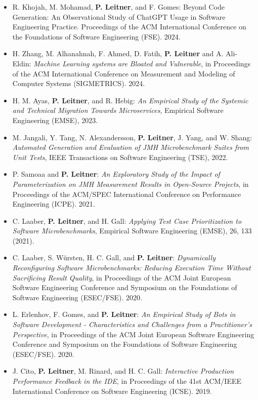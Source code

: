 \documentclass[paper=letter,fontsize=11pt]{scrartcl} %
\begin{document}
\begin{itemize}
  \itemsep0em
  \item  R. Khojah, M. Mohamad, \textbf{P. Leitner}, and F. Gomes: Beyond Code Generation: An Observational Study of ChatGPT Usage in Software Engineering Practice. Proceedings of the ACM International Conference on the Foundations of Software Engineering (FSE). 2024.
  \item H. Zhang, M. Alhanahnah, F. Ahmed, D. Fatih, \textbf{P. Leitner} and A. Ali-Eldin: \emph{Machine Learning systems are Bloated and Vulnerable}, in Proceedings of the ACM International Conference on Measurement and Modeling of Computer Systems (SIGMETRICS). 2024.    
  \item H. M. Ayas, \textbf{P. Leitner}, and R. Hebig: \emph{An Empirical Study of the Systemic and Technical Migration Towards Microservices}, Empirical Software Engineering (EMSE), 2023.
  \item M. Jangali, Y. Tang, N. Alexandersson, \textbf{P. Leitner}, J. Yang, and W. Shang: \emph{Automated Generation and Evaluation of JMH Microbenchmark Suites from Unit Tests}, IEEE Transactions on Software Engineering (TSE), 2022.
  \item P. Samoaa and \textbf{P. Leitner}: \emph{An Exploratory Study of the Impact of Parameterization on JMH Measurement Results in Open-Source Projects}, in Proceedings of the ACM/SPEC  International Conference on Performance Engineering (ICPE). 2021.    
  \item C. Laaber, \textbf{P. Leitner}, and H. Gall: \emph{Applying Test Case Prioritization to Software Microbenchmarks}, Empirical Software Engineering (EMSE), 26, 133 (2021).
\item C. Laaber,  S. Würsten, H. C. Gall, and \textbf{P. Leitner}: \emph{Dynamically Reconfiguring Software Microbenchmarks: Reducing Execution Time Without Sacrificing Result Quality}, in Proceedings of the ACM Joint European Software Engineering Conference and Symposium on the Foundations of Software Engineering (ESEC/FSE). 2020.
\item L. Erlenhov,  F. Gomes, and \textbf{P. Leitner}: \emph{An Empirical Study of Bots in Software Development - Characteristics and Challenges from a Practitioner's Perspective}, in Proceedings of the ACM Joint European Software Engineering Conference and Symposium on the Foundations of Software Engineering (ESEC/FSE). 2020.
  \item J. Cito, \textbf{P. Leitner}, M. Rinard, and H. C. Gall: \emph{Interactive Production Performance Feedback in the IDE}, in Proceedings of the 41st ACM/IEEE International Conference on Software Engineering (ICSE). 2019.

\end{itemize}
\end{document}
